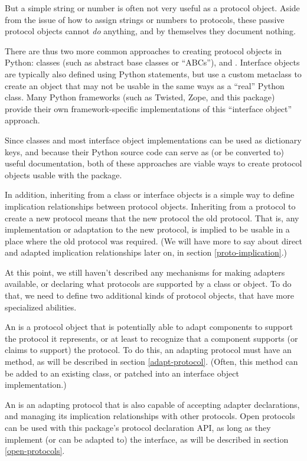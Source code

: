 But a simple string or number is often not very useful as a protocol
object.  Aside from the issue of how to assign strings or numbers to
protocols, these passive protocol objects cannot \emph{do} anything, and by
themselves they document nothing.

There are thus two more common approaches to creating protocol objects in
Python: classes (such as abstract base classes or ``ABCs''), and .  Interface objects are typically also defined using Python
 statements, but use a custom metaclass to create an object
that may not be usable in the same ways as a ``real'' Python class.  Many
Python frameworks (such as Twisted, Zope, and this package) provide their own
framework-specific implementations of this ``interface object'' approach.

Since classes and most interface object implementations can be used as
dictionary keys, and because their Python source code can serve as (or
be converted to) useful documentation, both of these approaches are viable
ways to create protocol objects usable with the  package.

In addition, inheriting from a class or interface objects is a simple way to
define implication relationships between protocol objects.  Inheriting from a
protocol to create a new protocol means that the new protocol 
the old protocol.  That is, any implementation or adaptation to the new
protocol, is implied to be usable in a place where the old protocol was
required.  (We will have more to say about direct and adapted implication
relationships later on, in section \ref{proto-implication}.)

At this point, we still haven't described any mechanisms for making adapters
available, or declaring what protocols are supported by a class or object.
To do that, we need to define two additional kinds of protocol objects, that
have more specialized abilities.

An  is a protocol object that is potentially able to
adapt components to support the protocol it represents, or at least to
recognize that a component supports (or claims to support) the protocol.  To
do this, an adapting protocol must have an  method, as
will be described in section \ref{adapt-protocol}.  (Often, this method
can be added to an existing class, or patched into an interface object
implementation.)



An  is an adapting protocol that is also capable of
accepting adapter declarations, and managing its implication relationships
with other protocols.  Open protocols can be used with this package's
protocol declaration API, as long as they implement (or can be adapted to)
the  interface, as will be described in section
\ref{open-protocols}.

